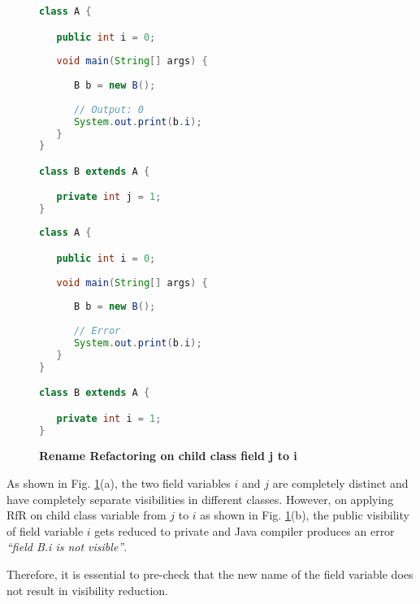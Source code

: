 \begin{figure}[th]
\centering
\begin{minipage}[t]{0.47\linewidth}
\begin{lstlisting}[language=java, basicstyle=\scriptsize\ttfamily,frame=single]
class A {

   public int i = 0;
	
   void main(String[] args) {
	
      B b = new B();
      
      // Output: 0
      System.out.print(b.i); 
   }
}

class B extends A {

   private int j = 1;
}
\end{lstlisting}
\end{minipage}
\hfill
\begin{minipage}[t]{0.47\linewidth}
\begin{lstlisting}[language=java, basicstyle=\scriptsize\ttfamily,frame=single]
class A {

   public int i = 0;
	
   void main(String[] args) {
	
      B b = new B();
      
      // Error
      System.out.print(b.i); 
   }
}

class B extends A {

   private int i = 1;
}
\end{lstlisting}
\end{minipage}
\caption{\textbf{Rename Refactoring on child class field j to i}}
\label{figure:jtoi}
\end{figure}


As shown in Fig. \ref{figure:jtoi}(a), the two field variables $i$ and $j$ are completely distinct and have completely separate visibilities in different classes. However, on applying RfR on child class variable from $j$ to $i$ as shown in Fig. \ref{figure:jtoi}(b), the public visibility of field variable $i$ gets reduced to private and Java compiler produces an error \textit{``field B.i is not visible''}. 

Therefore, it is essential to pre-check that the new name of the field variable does not result in visibility reduction. 